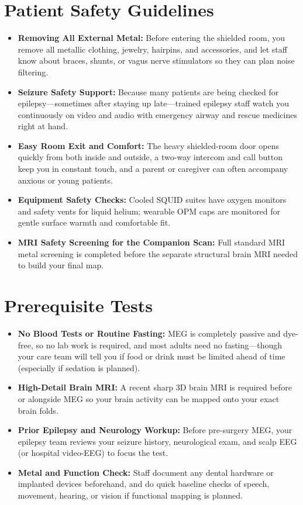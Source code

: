 \section{Patient Safety Guidelines}
\begin{itemize}
  \item \textbf{Removing All External Metal:} Before entering the shielded room, you remove all metallic clothing, jewelry, hairpins, and accessories, and let staff know about braces, shunts, or vagus nerve stimulators so they can plan noise filtering.
  \item \textbf{Seizure Safety Support:} Because many patients are being checked for epilepsy---sometimes after staying up late---trained epilepsy staff watch you continuously on video and audio with emergency airway and rescue medicines right at hand.
  \item \textbf{Easy Room Exit and Comfort:} The heavy shielded-room door opens quickly from both inside and outside, a two-way intercom and call button keep you in constant touch, and a parent or caregiver can often accompany anxious or young patients.
  \item \textbf{Equipment Safety Checks:} Cooled SQUID suites have oxygen monitors and safety vents for liquid helium; wearable OPM caps are monitored for gentle surface warmth and comfortable fit.
  \item \textbf{MRI Safety Screening for the Companion Scan:} Full standard MRI metal screening is completed before the separate structural brain MRI needed to build your final map.
\end{itemize}

\section{Prerequisite Tests}
\begin{itemize}
  \item \textbf{No Blood Tests or Routine Fasting:} MEG is completely passive and dye-free, so no lab work is required, and most adults need no fasting---though your care team will tell you if food or drink must be limited ahead of time (especially if sedation is planned).
  \item \textbf{High-Detail Brain MRI:} A recent sharp 3D brain MRI is required before or alongside MEG so your brain activity can be mapped onto your exact brain folds.
  \item \textbf{Prior Epilepsy and Neurology Workup:} Before pre-surgery MEG, your epilepsy team reviews your seizure history, neurological exam, and scalp EEG (or hospital video-EEG) to focus the test.
  \item \textbf{Metal and Function Check:} Staff document any dental hardware or implanted devices beforehand, and do quick baseline checks of speech, movement, hearing, or vision if functional mapping is planned.
\end{itemize}

